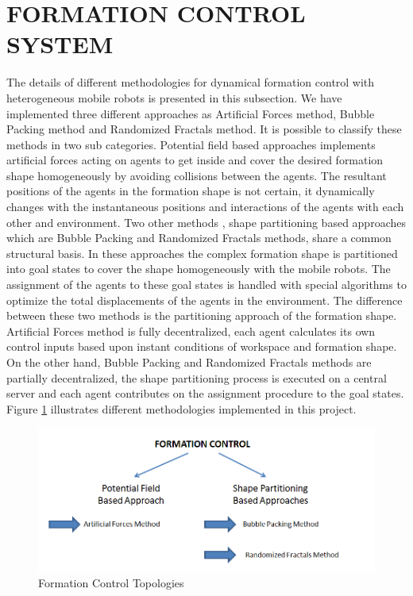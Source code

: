 \section{FORMATION CONTROL SYSTEM} \label{formation_control_ref}
The details of different methodologies for dynamical formation control with heterogeneous mobile robots is presented in this subsection. We have implemented three different approaches as Artificial Forces method, Bubble Packing method and Randomized Fractals method. It is possible to classify these methods in two sub categories. Potential field based approaches implements artificial forces acting on agents to get inside and cover the desired formation shape homogeneously by avoiding collisions between the agents. The resultant positions of the agents in the formation shape is not certain, it dynamically changes with the instantaneous positions and interactions of the agents with each other and environment. Two other methods , shape partitioning based approaches which are Bubble Packing and Randomized Fractals methods, share a common structural basis. In these approaches the complex formation shape is partitioned into goal states to cover the shape homogeneously with the mobile robots. The assignment of the agents to these goal states is handled with special algorithms to optimize the total displacements of the agents in the environment. The difference between these two methods is the partitioning approach of the formation shape. Artificial Forces method is fully decentralized, each agent calculates its own control inputs based upon instant conditions of workspace and formation shape. On the other hand, Bubble Packing and Randomized Fractals methods are partially decentralized, the shape partitioning process is executed on a central server and each agent contributes on the assignment procedure to the goal states. Figure \ref{formation_controlin_figi} illustrates different methodologies implemented in this project.
		
\begin{figure}[H]
\caption{Formation Control Topologies} \label{formation_controlin_figi}
\centering
\includegraphics[scale = 0.60]{methods}
\end{figure}		
		
